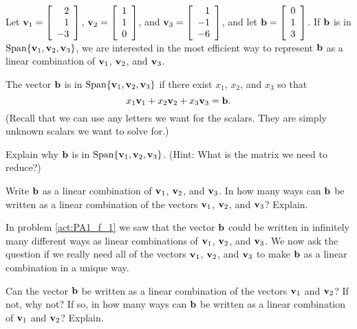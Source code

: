 \begin{pa} \label{pa:1_f} Let $\mathbf{v}_1 = \left[ \begin{array}{r} 2\\1\\-3 \end{array} \right]$, $\mathbf{v}_2 =  \left[ \begin{array}{c} 1\\1\\0 \end{array} \right]$, and $\mathbf{v}_3 = \left[ \begin{array}{r} 1\\-1\\-6 \end{array} \right]$, and let $\mathbf{b} = \left[ \begin {array}{c} 0 \\ 1 \\ 3 \end {array} \right]$. If $\mathbf{b}$ is in $\text{Span} \{\mathbf{v}_1, \mathbf{v}_2, \mathbf{v}_3\}$, we are interested in the most efficient way to represent $\mathbf{b}$ as a linear combination of $\mathbf{v}_1$, $\mathbf{v}_2$, and $\mathbf{v}_3$. 
\be
\item \label{act:PA1_f_1} The vector $\mathbf{b}$ is in $\text{Span} \{\mathbf{v}_1, \mathbf{v}_2, \mathbf{v}_3\}$ if there exist $x_1$, $x_2$, and $x_3$ so that 
\[x_1 \mathbf{v}_1 + x_2 \mathbf{v}_2 + x_3 \mathbf{v}_3 = \mathbf{b}.\]
(Recall that we can use any letters we want for the scalars. They are simply unknown scalars we want to solve for.)
	\ba
	\item Explain why $\mathbf{b}$ is in $\text{Span} \{\mathbf{v}_1, \mathbf{v}_2, \mathbf{v}_3\}$. (Hint: What is the matrix we need to reduce?) 


	\item Write $\mathbf{b}$ as a linear combination of $\mathbf{v}_1$, $\mathbf{v}_2$, and $\mathbf{v}_3$. In how many ways can $\mathbf{b}$ be written as a linear combination of the vectors $\mathbf{v}_1$, $\mathbf{v}_2$, and $\mathbf{v}_3$? Explain. 


	\ea



\item \label{act:PA1_f_2}  In problem \ref{act:PA1_f_1} we saw that the vector $\mathbf{b}$ could be written in infinitely many different ways as linear combinations of $\mathbf{v}_1$, $\mathbf{v}_2$, and $\mathbf{v}_3$. We now ask the question if we really need all of the vectors $\mathbf{v}_1$, $\mathbf{v}_2$, and $\mathbf{v}_3$ to make $\mathbf{b}$ as a linear combination in a unique way.  
	\ba
	\item Can the vector $\mathbf{b}$ be written as a linear combination of the vectors $\mathbf{v}_1$ and $\mathbf{v}_2$? If not, why not? If so, in how many ways can $\mathbf{b}$ be written as a linear combination of $\mathbf{v}_1$ and $\mathbf{v}_2$? Explain.



\end{pa}
